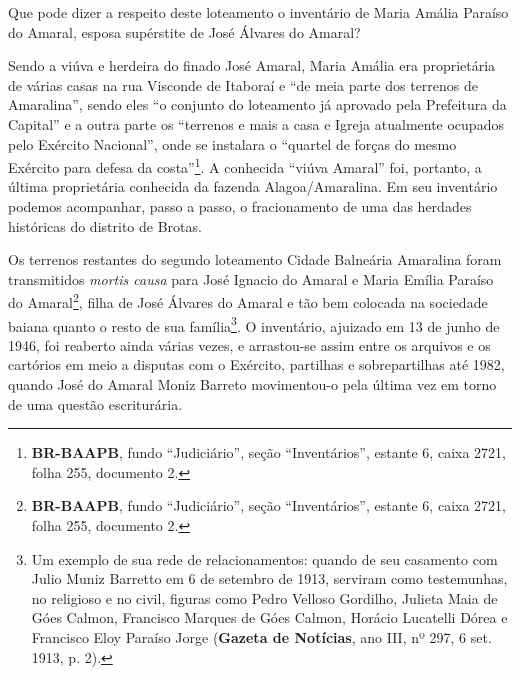 Que pode dizer a respeito deste loteamento o inventário de Maria Amália Paraíso do Amaral, esposa supérstite de José Álvares do Amaral? 

Sendo a viúva e herdeira do finado José Amaral, Maria Amália era proprietária de várias casas na rua Visconde de Itaboraí e ``de meia parte dos terrenos de Amaralina'', sendo eles ``o conjunto do loteamento já aprovado pela Prefeitura da Capital'' e a outra parte os ``terrenos e mais a casa e Igreja atualmente ocupados pelo Exército Nacional'', onde se instalara o ``quartel de forças do mesmo Exército para defesa da costa''\footnote{\textbf{BR-BAAPB}, fundo ``Judiciário'', seção ``Inventários'', estante 6, caixa 2721, folha 255, documento 2.}. A conhecida ``viúva Amaral'' foi, portanto, a última proprietária conhecida da fazenda Alagoa/Amaralina. Em seu inventário podemos acompanhar, passo a passo, o fracionamento de uma das herdades históricas do distrito de Brotas. 

Os terrenos restantes do segundo loteamento Cidade Balneária Amaralina foram transmitidos \textit{mortis causa} para José Ignacio do Amaral e Maria Emília Paraíso do Amaral\footnote{\textbf{BR-BAAPB}, fundo ``Judiciário'', seção ``Inventários'', estante 6, caixa 2721, folha 255, documento 2.}, filha de
José Álvares do Amaral e tão bem colocada na sociedade baiana quanto o resto de sua família\footnote{Um exemplo de sua rede de relacionamentos: quando de seu casamento com Julio Muniz Barretto em 6 de setembro de 1913, serviram como testemunhas, no religioso e no civil, figuras como Pedro Velloso Gordilho, Julieta Maia de Góes Calmon, Francisco Marques de Góes Calmon, Horácio Lucatelli Dórea e Francisco Eloy Paraíso Jorge (\textbf{Gazeta de Notícias}, ano III, nº 297, 6 set. 1913, p. 2).}. O inventário, ajuizado em 13 de junho de 1946, foi reaberto ainda várias vezes, e arrastou-se assim entre os arquivos e os cartórios em meio a disputas com o Exército, partilhas e sobrepartilhas até 1982, quando José do Amaral Moniz Barreto movimentou-o pela última vez em torno de uma questão escriturária.

